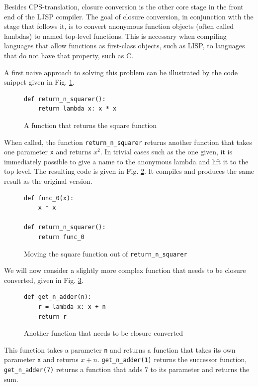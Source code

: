 \documentclass[11pt]{report}
\begin{document}
Besides CPS-translation, closure conversion is the other core stage in the front end of the LJSP compiler. The goal of closure conversion, in conjunction with the stage that follows it, is to convert anonymous function objects (often called lambdas) to named top-level functions. This is necessary when compiling languages that allow functions as first-class objects, such as LISP, to languages that do not have that property, such as C.

A first naive approach to solving this problem can be illustrated by the code snippet given in Fig. \ref{cc1}.

\begin{figure}[h!]
\begin{lstlisting}
def return_n_squarer():
    return lambda x: x * x
\end{lstlisting}
\caption{A function that returns the square function}
\label{cc1}
\end{figure}

When called, the function \texttt{return_n_squarer} returns another function that takes one parameter \texttt{x} and returns $x^2$. In trivial cases such as the one given, it is immediately possible to give a name to the anonymous lambda and lift it to the top level. The resulting code is given in Fig. \ref{cc2}. It compiles and produces the same result as the original version.

\begin{figure}[h!]
\begin{lstlisting}
def func_0(x):
    x * x
    
def return_n_squarer():
    return func_0
\end{lstlisting}
\caption{Moving the square function out of \texttt{return_n_squarer}}
\label{cc2}
\end{figure}

We will now consider a slightly more complex function that needs to be closure converted, given in Fig. \ref{cc3}.

\begin{figure}[ht]
\begin{lstlisting}
def get_n_adder(n):
    r = lambda x: x + n
    return r
\end{lstlisting}
\caption{Another function that needs to be closure converted}
\label{cc3}
\end{figure}

This function takes a parameter \texttt{n} and returns a function that takes its own parameter \texttt{x} and returns $x+n$. \texttt{get_n_adder(1)} returns the successor function, \texttt{get_n_adder(7)} returns a function that adds $7$ to its parameter and returns the sum.
\end{document}
